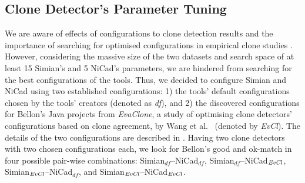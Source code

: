 \documentclass{sig-alternate-05-2015}
\begin{document}
\subsection{Clone Detector's Parameter Tuning}
We are aware of effects of configurations to clone detection results and the importance of searching for optimised configurations in empirical clone studies \cite{Wang2014,cr2016ssbse,Ragkhitwetsagul2016,Svajlenko2014}. However, considering the massive size of the two datasets and search space of at least 15 Simian's and 5 NiCad's parameters, we are hindered from searching for the best configurations of the tools. Thus, we decided to configure Simian and NiCad using two established configurations: 1) the tools' default configurations chosen by the tools' creators (denoted as \textit{df}), and 2) the discovered configurations for Bellon's Java projects from \textit{EvaClone}, a study of optimising clone detectors' configurations based on clone agreement, by Wang et al.~\cite{Wang2013} (denoted by \textit{EvCl}). The details of the two configurations are described in . Having two clone detectors with two chosen configurations each, we look for Bellon's good and ok-match in four possible pair-wise combinations: Simian$_{df}$--NiCad$_{df}$, Simian$_{df}$--NiCad$_{\textrm{\textit{EvCl}}}$, Simian$_{\textrm{\textit{EvCl}}}$--NiCad$_{df}$, and Simian$_{\textrm{\textit{EvCl}}}$--NiCad$_{\textrm{\textit{EvCl}}}$.

\begin{table}
	\centering
	\caption{Configurations of Simian and NiCad}
	\label{t:param_tuning}
\end{table}
\end{document}
